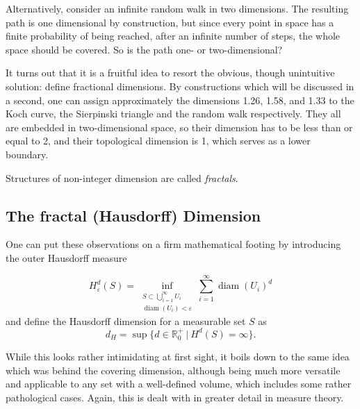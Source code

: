 \documentclass[twocolumn, 10pt]{scrartcl}
\begin{document}
            Alternatively, consider an infinite random walk in two dimensions. The resulting path is one dimensional by
            construction, but since every point in space has a finite probability of being reached, after an infinite
            number of steps, the whole space should be covered. So is the path one- or two-dimensional?

            It turns out that it is a fruitful idea to resort the obvious, though unintuitive solution: define
            fractional dimensions. By constructions which will be discussed in a second, one can assign approximately
            the dimensions 1.26, 1.58, and 1.33 to the Koch curve, the Sierpinski triangle and the
            random walk respectively. They all are embedded in two-dimensional space, so their dimension has to be
            less than or equal to 2, and their topological dimension is 1, which serves as a lower boundary.

            Structures of non-integer dimension are called \emph{fractals}.

        \subsection{The fractal (Hausdorff) Dimension}
            One can put these observations on a firm mathematical footing by introducing the outer Hausdorff measure

            \begin{equation*}
                H^d_\varepsilon(S)=
                \inf_{\substack{S \subset\bigcup_{i=1}^\infty U_i\\ \operatorname{diam}(U_i) <
                \varepsilon}}
                    \sum_{i=1}^\infty \operatorname{diam}(U_i)^d
            \end{equation*}
            and define the Hausdorff dimension for a measurable set $S$ as
            \begin{equation*}
                d_H = \sup\{d\in\mathbb{R}^+_0\ |\ H^d(S) = \infty\}.
            \end{equation*}

            While this looks rather intimidating at first sight, it boils down to the same idea which was behind the
            covering dimension, although being much more versatile and applicable to any set with a well-defined
            volume, which includes some rather pathological cases. Again, this is dealt with in greater detail in
            measure theory.
\end{document}
